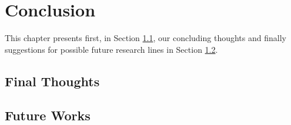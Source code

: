 \chapter{Conclusion}
\label{chap:conclusion}
 
 
This chapter presents first, in Section \ref{sec:concl}, our concluding thoughts and 
finally suggestions for possible future research lines in Section \ref{sec:future}.



\section{Final Thoughts}
\label{sec:concl}

\lipsum[2]



\section{Future Works}
\label{sec:future}

\lipsum[2]
